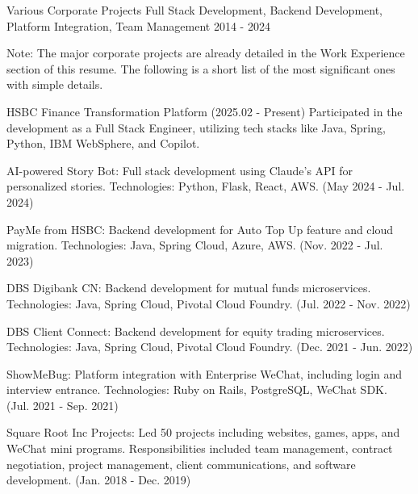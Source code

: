 
\begin{cventries}

  \cventry
    {Various Corporate Projects} %
    {Full Stack Development, Backend Development, Platform Integration, Team Management} %
    {} %
    {2014 - 2024} %
    {
      \begin{cvitems} %
        \item {Note: The major corporate projects are already detailed in the Work Experience section of this resume. The following is a short list of the most significant ones with simple details.}
        \item {HSBC Finance Transformation Platform (2025.02 - Present) Participated in the development as a Full Stack Engineer, utilizing tech stacks like Java, Spring, Python, IBM WebSphere, and Copilot.}
        \item {AI-powered Story Bot: Full stack development using Claude’s API for personalized stories. Technologies: Python, Flask, React, AWS. (May 2024 - Jul. 2024)}
        \item {PayMe from HSBC: Backend development for Auto Top Up feature and cloud migration. Technologies: Java, Spring Cloud, Azure, AWS. (Nov. 2022 - Jul. 2023)}
        \item {DBS Digibank CN: Backend development for mutual funds microservices. Technologies: Java, Spring Cloud, Pivotal Cloud Foundry. (Jul. 2022 - Nov. 2022)}
        \item {DBS Client Connect: Backend development for equity trading microservices. Technologies: Java, Spring Cloud, Pivotal Cloud Foundry. (Dec. 2021 - Jun. 2022)}
        \item {ShowMeBug: Platform integration with Enterprise WeChat, including login and interview entrance. Technologies: Ruby on Rails, PostgreSQL, WeChat SDK. (Jul. 2021 - Sep. 2021)}
        \item {Square Root Inc Projects: Led 50 projects including websites, games, apps, and WeChat mini programs. Responsibilities included team management, contract negotiation, project management, client communications, and software development. (Jan. 2018 - Dec. 2019)}

\end{cvitems}}
\end{cventries}
